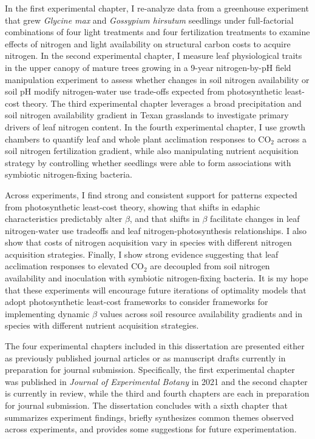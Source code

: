 In the first experimental chapter, I re-analyze data from a greenhouse experiment that grew \textit{Glycine max} and \textit{Gossypium hirsutum} seedlings under full-factorial combinations of four light treatments and four fertilization treatments to examine effects of nitrogen and light availability on structural carbon costs to acquire nitrogen. In the second experimental chapter, I measure leaf physiological traits in the upper canopy of mature trees growing in a 9-year nitrogen-by-pH field manipulation experiment to assess whether changes in soil nitrogen availability or soil pH modify nitrogen-water use trade-offs expected from photosynthetic least-cost theory. The third experimental chapter leverages a broad precipitation and soil nitrogen availability gradient in Texan grasslands to investigate primary drivers of leaf nitrogen content. In the fourth experimental chapter, I use growth chambers to quantify leaf and whole plant acclimation responses to CO$_2$ across a soil nitrogen fertilization gradient, while also manipulating nutrient acquisition strategy by controlling whether seedlings were able to form associations with symbiotic nitrogen-fixing bacteria.

Across experiments, I find strong and consistent support for patterns expected from photosynthetic least-cost theory, showing that shifts in edaphic characteristics predictably alter $\beta$, and that shifts in $\beta$ facilitate changes in leaf nitrogen-water use tradeoffs and leaf nitrogen-photosynthesis relationships. I also show that costs of nitrogen acquisition vary in species with different nitrogen acquisition strategies. Finally, I show strong evidence suggesting that leaf acclimation responses to elevated CO$_2$ are decoupled from soil nitrogen availability and inoculation with symbiotic nitrogen-fixing bacteria. It is my hope that these experiments will encourage future iterations of optimality models that adopt photosynthetic least-cost frameworks to consider frameworks for implementing dynamic $\beta$ values across soil resource availability gradients and in species with different nutrient acquisition strategies.

The four experimental chapters included in this dissertation are presented either as previously published journal articles or as manuscript drafts currently in preparation for journal submission. Specifically, the first experimental chapter was published in \textit{Journal of Experimental Botany} in 2021 and the second chapter is currently in review, while the third and fourth chapters are each in preparation for journal submission. The dissertation concludes with a sixth chapter that summarizes experiment findings, briefly synthesizes common themes observed across experiments, and provides some suggestions for future experimentation.